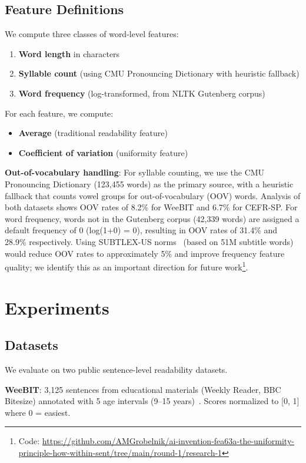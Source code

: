 \documentclass[11pt,letterpaper]{article}
\begin{document}
\subsection{Feature Definitions}

We compute three classes of word-level features:
\begin{enumerate}
  \item \textbf{Word length} in characters
  \item \textbf{Syllable count} (using CMU Pronouncing Dictionary with heuristic fallback)
  \item \textbf{Word frequency} (log-transformed, from NLTK Gutenberg corpus)
\end{enumerate}

For each feature, we compute:
\begin{itemize}
  \item \textbf{Average} (traditional readability feature)
  \item \textbf{Coefficient of variation} (uniformity feature)
\end{itemize}

\textbf{Out-of-vocabulary handling}: For syllable counting, we use the CMU Pronouncing Dictionary (123,455 words) as the primary source, with a heuristic fallback that counts vowel groups for out-of-vocabulary (OOV) words. Analysis of both datasets shows OOV rates of 8.2\% for WeeBIT and 6.7\% for CEFR-SP. For word frequency, words not in the Gutenberg corpus (42,339 words) are assigned a default frequency of 0 (log(1+0) = 0), resulting in OOV rates of 31.4\% and 28.9\% respectively. Using SUBTLEX-US norms~\cite{Brysbaert2009} (based on 51M subtitle words) would reduce OOV rates to approximately 5\% and improve frequency feature quality; we identify this as an important direction for future work\footnote{Code: \url{https://github.com/AMGrobelnik/ai-invention-fea63a-the-uniformity-principle-how-within-sent/tree/main/round-1/research-1}}.

\section{Experiments}

\subsection{Datasets}

We evaluate on two public sentence-level readability datasets.

\textbf{WeeBIT}: 3,125 sentences from educational materials (Weekly Reader, BBC Bitesize) annotated with 5 age intervals (9--15 years)~\cite{Vajjala2012}. Scores normalized to [0, 1] where 0 = easiest.
\end{document}
